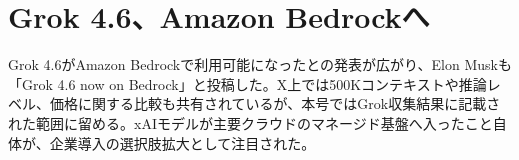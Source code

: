 \section{Grok 4.6、Amazon Bedrockへ}
Grok 4.6がAmazon Bedrockで利用可能になったとの発表が広がり、Elon Muskも「Grok 4.6 now on Bedrock」と投稿した。X上では500Kコンテキストや推論レベル、価格に関する比較も共有されているが、本号ではGrok収集結果に記載された範囲に留める。xAIモデルが主要クラウドのマネージド基盤へ入ったこと自体が、企業導入の選択肢拡大として注目された。
